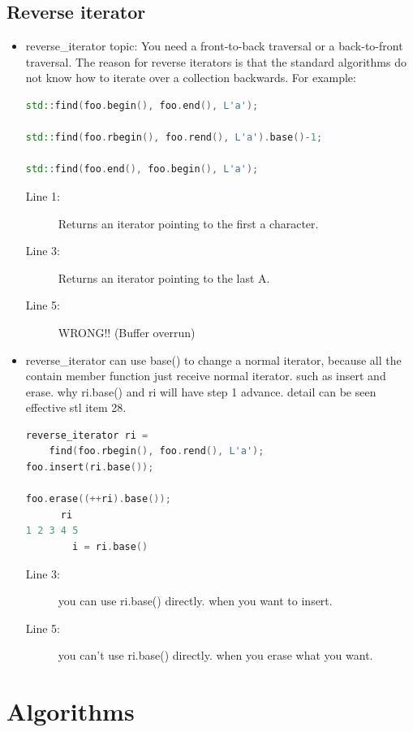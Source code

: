 \documentclass[a4paper,11pt,twoside]{book}
\begin{document}
\subsection{Reverse iterator}
\begin{itemize}
\item reverse\_iterator topic:
You need a front-to-back traversal or a back-to-front traversal. The reason for reverse iterators is that the standard algorithms do not know how to iterate over a collection backwards. For example:
\begin{lstlisting}[frame=single, language=c++]
std::find(foo.begin(), foo.end(), L'a');

std::find(foo.rbegin(), foo.rend(), L'a').base()-1;

std::find(foo.end(), foo.begin(), L'a');
\end{lstlisting}
\begin{description}
	\item[Line 1:] Returns an iterator pointing to the first a character.
	\item[Line 3:] Returns an iterator pointing to the last A.
	\item[Line 5:] WRONG!! (Buffer overrun)
\end{description}
\item reverse\_iterator can use base() to change a normal iterator, because all the contain member function just receive normal iterator. such as insert and erase.
why ri.base() and ri will have step 1 advance. detail can be seen effective stl item 28.
\begin{lstlisting}[frame=single, language=c++]
reverse_iterator ri =
    find(foo.rbegin(), foo.rend(), L'a');
foo.insert(ri.base()); 
                          
foo.erase((++ri).base()); 
      ri
1 2 3 4 5
        i = ri.base()
\end{lstlisting}
\begin{description}
	\item[Line 3:] you can use ri.base() directly. when you want to insert.
	\item[Line 5:] you can't use ri.base() directly. when you erase what you want.
\end{description}

\end{itemize}

\section{Algorithms}
\end{document}
